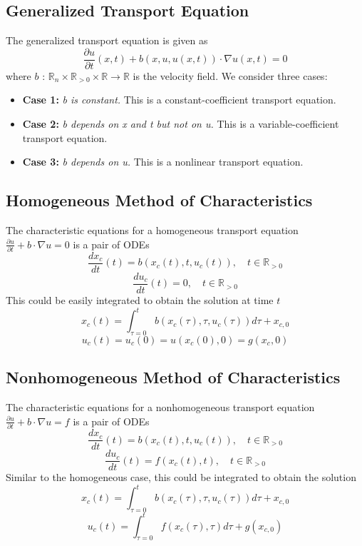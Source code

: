 \documentclass[11pt]{article}
\newcommand{\R}{\mathbb{R}}
\begin{document}
\subsection{Generalized Transport Equation}
The generalized transport equation is given as 
$$ \frac{\partial u}{\partial t}(x,t) + b(x,u,u(x,t))\cdot \nabla u(x,t) = 0$$
where $b$ : $\R_n \times \R_{>0} \times \R \rightarrow \R$ is the velocity field. We consider three cases:
\begin{itemize}
\item \textbf{Case 1:} \textit{b is constant.} This is a constant-coefficient transport equation.
\item \textbf{Case 2:}\textit{ b depends on x and t but not on u.} This is a variable-coefficient transport equation.
\item \textbf{Case 3:} \textit{b depends on u.} This is a nonlinear transport equation.
\end{itemize}
\subsection{Homogeneous Method of Characteristics}
The characteristic equations for a homogeneous transport equation $\frac{\partial u}{\partial t} + b\cdot \nabla u = 0$ is a pair of ODEs 
$$ \frac{dx_c}{dt}(t) =b (x_c(t),t, u_c(t)), \quad t \in \R_{>0}$$ 
$$ \frac{du_c}{dt}(t) =0, \quad t \in \R_{>0}$$
This could be easily integrated to obtain the solution at time $t$
$$x_c(t) = \int_{\tau=0}^{t} b(x_c(\tau), \tau, u_c(\tau)) d\tau + x_{c,0}$$
$$ u_c(t) = u_c(0) = u(x_c(0), 0) = g(x_c,0)$$
\subsection{Nonhomogeneous Method of Characteristics}
The characteristic equations for a nonhomogeneous transport equation $\frac{\partial u}{\partial t} + b\cdot \nabla u = f$ is a pair of ODEs 
$$ \frac{dx_c}{dt}(t) =b (x_c(t),t, u_c(t)), \quad t \in \R_{>0}$$ 
$$ \frac{du_c}{dt}(t) = f(x_c(t), t), \quad t \in \R_{>0}$$
Similar to the homogeneous case, this could be integrated to obtain the solution 
$$x_c(t) = \int_{\tau=0}^{t} b(x_c(\tau), \tau, u_c(\tau)) d\tau + x_{c,0}$$
$$ u_c(t) =   \int_{\tau=0}^{t} f(x_c(\tau), \tau)d\tau + g(x_{c,0})$$
\end{document}
